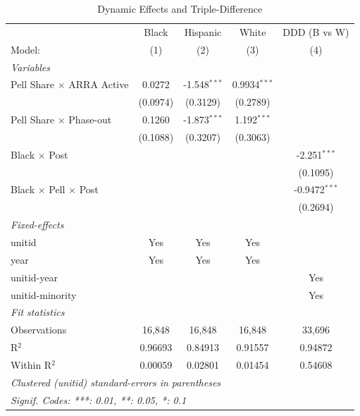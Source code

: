 
\begin{table}[htbp]
   \caption{\label{tab:dynamic} Dynamic Effects and Triple-Difference}
   \centering
   \begin{tabular}{lcccc}
      \tabularnewline \midrule \midrule
                                          & Black    & Hispanic       & White          & DDD (B vs W) \\   
      Model:                              & (1)      & (2)            & (3)            & (4)\\  
      \midrule
      \emph{Variables}\\
      Pell Share $\times$ ARRA Active     & 0.0272   & -1.548$^{***}$ & 0.9934$^{***}$ &   \\   
                                          & (0.0974) & (0.3129)       & (0.2789)       &   \\   
      Pell Share $\times$ Phase-out       & 0.1260   & -1.873$^{***}$ & 1.192$^{***}$  &   \\   
                                          & (0.1088) & (0.3207)       & (0.3063)       &   \\   
      Black $\times$ Post                 &          &                &                & -2.251$^{***}$\\   
                                          &          &                &                & (0.1095)\\   
      Black $\times$ Pell $\times$ Post   &          &                &                & -0.9472$^{***}$\\   
                                          &          &                &                & (0.2694)\\   
      \midrule
      \emph{Fixed-effects}\\
      unitid                              & Yes      & Yes            & Yes            & \\  
      year                                & Yes      & Yes            & Yes            & \\  
      unitid-year                         &          &                &                & Yes\\  
      unitid-minority                     &          &                &                & Yes\\  
      \midrule
      \emph{Fit statistics}\\
      Observations                        & 16,848   & 16,848         & 16,848         & 33,696\\  
      R$^2$                               & 0.96693  & 0.84913        & 0.91557        & 0.94872\\  
      Within R$^2$                        & 0.00059  & 0.02801        & 0.01454        & 0.54608\\  
      \midrule \midrule
      \multicolumn{5}{l}{\emph{Clustered (unitid) standard-errors in parentheses}}\\
      \multicolumn{5}{l}{\emph{Signif. Codes: ***: 0.01, **: 0.05, *: 0.1}}\\
   \end{tabular}
   

\end{table}
